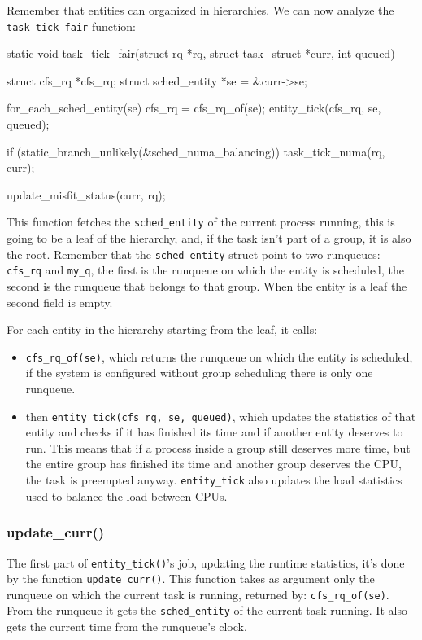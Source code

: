 \documentclass[10pt]{book}
\begin{document}
Remember that entities can organized in hierarchies.
We can now analyze the \verb|task_tick_fair| function:
\begin{code}
static void task_tick_fair(struct rq *rq, struct task_struct *curr, int queued)
{
	struct cfs_rq *cfs_rq;
	struct sched_entity *se = &curr->se;

	for_each_sched_entity(se) {
		cfs_rq = cfs_rq_of(se);
		entity_tick(cfs_rq, se, queued);
	}

	if (static_branch_unlikely(&sched_numa_balancing))
		task_tick_numa(rq, curr);

	update_misfit_status(curr, rq);
}
\end{code}

This function fetches the \verb|sched_entity| of the current process running, this is going to be a leaf of the hierarchy, and, if the task isn't part of a group, it is also the root. Remember that the \verb|sched_entity| struct point to two runqueues: \verb|cfs_rq| and \verb|my_q|, the first is the runqueue on which the entity is scheduled, the second is the runqueue that belongs to that group. When the entity is a leaf the second field is empty. 

For each entity in the hierarchy starting from the leaf, it calls:
\begin{itemize}
    \item \verb|cfs_rq_of(se)|, which returns the runqueue on which the entity is scheduled, if the system is configured without group scheduling there is only one runqueue.
    
    \item then \verb|entity_tick(cfs_rq, se, queued)|, which updates the statistics of that entity and checks if it has finished its time and if another entity deserves to run. This means that if a process inside a group still deserves more time, but the entire group has finished its time and another group deserves the CPU, the task is preempted anyway. \verb|entity_tick| also updates the load statistics used to balance the load between CPUs.
\end{itemize}

\subsubsection{update\_curr()}

The first part of \verb|entity_tick()|'s job, updating the runtime statistics, it's done by the function \verb|update_curr()|. This function takes as argument only the runqueue on which the current task is running, returned by: \verb|cfs_rq_of(se)|. From the runqueue it gets the \verb|sched_entity| of the current task running. It also gets the current time from the runqueue's clock.
\end{document}
